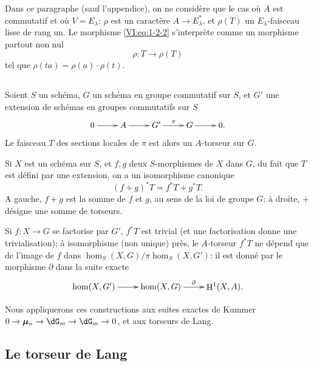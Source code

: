 \documentclass[oneside]{book}
\DeclareMathOperator{\h}{H}
\newcommand{\dmu}{{\bm\mu}}
\theoremstyle{sga-source}
\theoremstyle{sga-source-dash}
\theoremstyle{sga-source-dotdash}
\theoremstyle{sga-source-number-note-dash}
\theoremstyle{sga-source-note-number-dotdash}
\theoremstyle{sga-source-example-dotdash}
\theoremstyle{sga-source-inline-number}
\theoremstyle{sga-source-bare-number}
\theoremstyle{sga-source}
\newcommand{\PrintPage}[1]{}\newcommand{\MathPage}[1]{}\newcommand{\PrintCite}[2]{#1}\newcommand{\var}[3]{#2}
\begin{document}
Dans ce paragraphe (sauf l'appendice), on ne considère que le cas où $A$ 
est commutatif et où $V=E_\lambda$: $\rho$ est un caractère 
$A\to E_\lambda^\ast$, et $\rho(T)$ un $E_\lambda$-faisceau lisse de rang 
un. Le morphisme \eqref{VI:eq:1-2-2} s'interprète comme un morphisme partout 
non nul 
\begin{equation*}\tag{1.2.3}\label{VI:eq:1-2-3}
  \rho:T\to \rho(T) 
\end{equation*}
tel que $\rho(t a) = \rho(a)\cdot\rho(t)$. 





\subsection{}\label{VI:1-3}

Soient $S$ un schéma, $G$ un schéma en groupe commutatif sur $S$, et $G'$ 
une extension de schémas en groupes commutatifs sur $S$
\[\xymatrix{
  0 \ar[r] 
    & A \ar[r] 
    & G' \ar[r]^-\pi 
    & G \ar[r] 
    & 0 \text{.}
}\]
Le faisceau $T$ des sections locales de $\pi$ est alors un $A$-torseur sur 
$G$. 

\PrintPage{171}
Si $X$ est un schéma sur $S$, et $f,g$ deux $S$-morphismes de $X$ dans $G$, 
du fait que $T$ est défini par une extension, on a un isomorphisme 
canonique 
\begin{equation*}\tag{1.3.1}\label{VI:eq:1-3-1}
  (f+g)^\ast T = f^\ast T + g^\ast T \text{.}
\end{equation*}
A gauche, $f+g$ est la somme de $f$ et $g$, au sens de la loi de groupe $G$: 
à droite, $+$ désigne une somme de torseurs. 

Si $f:X\to G$ se factorise par $G'$, $f^\ast T$ est trivial (et une 
factorisation donne une trivialisation); à isomorphisme (non unique) près, 
le $A$-torseur $f^\ast T$ ne dépend que de l'image de $f$ dans 
$\hom_S(X,G)/\pi\hom_S(X,G')$: il est donné par le morphisme $\partial$ dans 
la suite exacte 
\[\xymatrix{
  \hom(X,G') \ar[r] 
    & \hom(X,G) \ar[r]^-\partial 
    & \h^1(X,A) \text{.}
}\]

Nous appliquerons ces constructions aux suites exactes de Kummer 
$0 \to \dmu_n \to \dG_m \to \dG_m \to 0$, et aux torseurs de Lang. 





\subsection{Le torseur de Lang}\label{VI:1-4}
\end{document}
